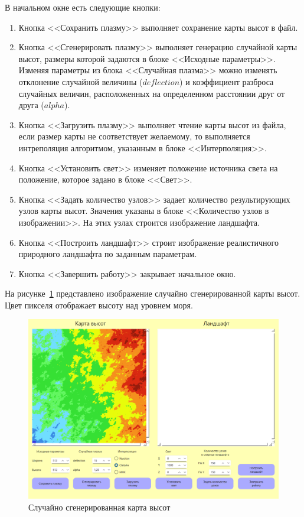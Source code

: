 \documentclass[a4paper, 14pt]{extreport}
\begin{document}
В начальном окне есть следующие кнопки:
\begin{enumerate}
	\item Кнопка <<Сохранить плазму>> выполняет сохранение карты высот в файл.
	\item Кнопка <<Сгенерировать плазму>> выполняет генерацию случайной карты высот, размеры которой задаются
	в блоке <<Исходные параметры>>. Изменяя параметры из блока <<Случайная плазма>> можно изменять отклонение
	случайной величины ($deflection$) и коэффициент разброса случайных величин, расположенных на определенном 
	расстоянии друг от друга ($alpha$).
	\item Кнопка <<Загрузить плазму>> выполняет чтение карты высот из файла, если размер карты не соответствует
	желаемому, то выполняется интреполяция алгоритмом, указанным в блоке <<Интерполяция>>.
	\item Кнопка <<Установить свет>> изменяет положение источника света на положение, которое задано в блоке 
	<<Свет>>.
	\item Кнопка <<Задать количество узлов>> задает количество результирующих узлов карты высот. Значения указаны в 
	блоке <<Количество узлов в изображении>>. На этих узлах строится изображение ландшафта.
	\item Кнопка <<Построить ландшафт>> строит изображение реалистичного природного ландшафта по заданным
	параметрам.
	\item Кнопка <<Завершить работу>> закрывает начальное окно.
\end{enumerate}

На рисунке~\ref{pict:ex2} представлено изображение случайно сгенерированной карты высот. Цвет пикселя отображает высоту
над уровнем моря.
\begin{figure}[h]
	\centering
	\includegraphics[scale=0.55]{tools/ex2.png}
	\caption{Случайно сгенерированная карта высот}
	\label{pict:ex2}
\end{figure}
\end{document}
